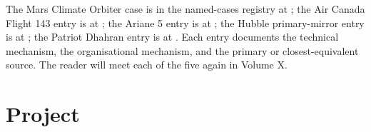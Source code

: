 The Mars Climate Orbiter case is in the named-cases registry at
; the
Air Canada Flight 143 entry is at
; the
Ariane 5 entry is at
; the Hubble
primary-mirror entry is at
;
the Patriot Dhahran entry is at
. Each
entry documents the technical mechanism, the organisational
mechanism, and the primary or closest-equivalent source. The reader
will meet each of the five again in Volume X.

\section{Project}

